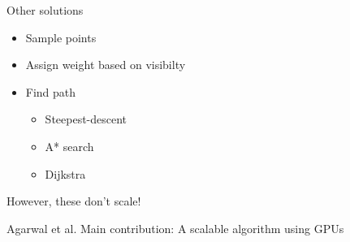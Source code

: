 \begin{frame}{Other solutions}
	\begin{itemize}
		\item Sample points
		\item Assign weight based on visibilty
		\item Find path
			\begin{itemize}
				\item Steepest-descent
				\item A* search
				\item Dijkstra
			\end{itemize}
	\end{itemize}

	However, these don't scale!

\end{frame}

\begin{frame}{Agarwal et al.}
	Main contribution: A scalable algorithm using GPUs
\end{frame}
